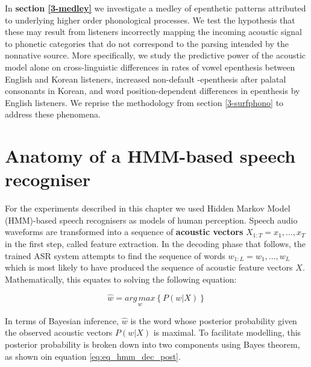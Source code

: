 In \textbf{section \ref{3-medley}} we investigate a medley of epenthetic patterns attributed to underlying higher order phonological processes. We test the hypothesis that these may result from listeners incorrectly mapping the incoming acoustic signal to phonetic categories that do not correspond to the parsing intended by the nonnative source. More specifically, we study the predictive power of the acoustic model alone on cross-linguistic differences in rates of vowel epenthesis between English and Korean listeners, increased non-default -epenthesis after palatal consonants in Korean, and word position-dependent differences in epenthesis by English listeners. We reprise the methodology from section \ref{3-surfphono} to address these phenomena.   


\newpage
\section{Anatomy of a HMM-based speech recogniser} \label{3-hmm}
For the experiments described in this chapter we used Hidden Markov Model (HMM)-based speech recognisers as models of human perception. 
Speech audio waveforms are transformed into a sequence of \textbf{acoustic vectors} $X_{1:T} = x_{1}, ..., x_{T}$ in the first step, called feature extraction. In the decoding phase that follows, the trained ASR system attempts to find the sequence of words $w_{1:L} = w_{1}, ..., w_{L}$ which is most likely to have produced the sequence of acoustic feature vectors $X$.
Mathematically, this equates to solving the following equation:

\begin{equation}
  \widehat{w} = \underset{w}{arg\,max} \left \{  P(w|X)\right \}
  \label{eq_hmm_dec_post}
\end{equation}

In terms of Bayesian inference, $\widehat{w}$ is the word whose posterior probability given the observed acoustic vectors $P(w|X)$ is maximal. To facilitate modelling, this posterior probability is broken down into two components using Bayes theorem, as shown oin equation \ref{eq:eq_hmm_dec_post}.  



